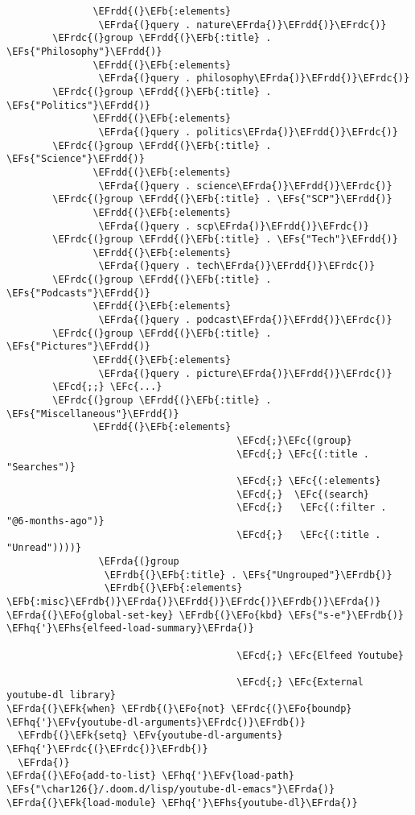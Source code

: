 \documentclass[a4wide,10pt]{article}
\newcommand{\EFc}[1]{\textcolor{EFc}{#1}} %
\newcommand{\EFcd}[1]{\textcolor{EFcd}{#1}} %
\newcommand{\EFs}[1]{\textcolor{EFs}{#1}} %
\newcommand{\EFk}[1]{\textcolor{EFk}{#1}} %
\newcommand{\EFb}[1]{\textcolor{EFb}{#1}} %
\newcommand{\EFv}[1]{\textcolor{EFv}{#1}} %
\newcommand{\EFo}[1]{\textcolor{EFo}{#1}} %
\newcommand{\EFhq}[1]{\textcolor{EFhq}{#1}} %
\newcommand{\EFhs}[1]{\textcolor{EFhs}{#1}} %
\newcommand{\EFrda}[1]{\textcolor{EFrda}{#1}} %
\newcommand{\EFrdb}[1]{\textcolor{EFrdb}{#1}} %
\newcommand{\EFrdc}[1]{\textcolor{EFrdc}{#1}} %
\newcommand{\EFrdd}[1]{\textcolor{EFrdd}{#1}} %
\begin{document}
\begin{Code}
\begin{Verbatim}
               \EFrdd{(}\EFb{:elements}
                \EFrda{(}query . nature\EFrda{)}\EFrdd{)}\EFrdc{)}
        \EFrdc{(}group \EFrdd{(}\EFb{:title} . \EFs{"Philosophy"}\EFrdd{)}
               \EFrdd{(}\EFb{:elements}
                \EFrda{(}query . philosophy\EFrda{)}\EFrdd{)}\EFrdc{)}
        \EFrdc{(}group \EFrdd{(}\EFb{:title} . \EFs{"Politics"}\EFrdd{)}
               \EFrdd{(}\EFb{:elements}
                \EFrda{(}query . politics\EFrda{)}\EFrdd{)}\EFrdc{)}
        \EFrdc{(}group \EFrdd{(}\EFb{:title} . \EFs{"Science"}\EFrdd{)}
               \EFrdd{(}\EFb{:elements}
                \EFrda{(}query . science\EFrda{)}\EFrdd{)}\EFrdc{)}
        \EFrdc{(}group \EFrdd{(}\EFb{:title} . \EFs{"SCP"}\EFrdd{)}
               \EFrdd{(}\EFb{:elements}
                \EFrda{(}query . scp\EFrda{)}\EFrdd{)}\EFrdc{)}
        \EFrdc{(}group \EFrdd{(}\EFb{:title} . \EFs{"Tech"}\EFrdd{)}
               \EFrdd{(}\EFb{:elements}
                \EFrda{(}query . tech\EFrda{)}\EFrdd{)}\EFrdc{)}
        \EFrdc{(}group \EFrdd{(}\EFb{:title} . \EFs{"Podcasts"}\EFrdd{)}
               \EFrdd{(}\EFb{:elements}
                \EFrda{(}query . podcast\EFrda{)}\EFrdd{)}\EFrdc{)}
        \EFrdc{(}group \EFrdd{(}\EFb{:title} . \EFs{"Pictures"}\EFrdd{)}
               \EFrdd{(}\EFb{:elements}
                \EFrda{(}query . picture\EFrda{)}\EFrdd{)}\EFrdc{)}
        \EFcd{;;} \EFc{...}
        \EFrdc{(}group \EFrdd{(}\EFb{:title} . \EFs{"Miscellaneous"}\EFrdd{)}
               \EFrdd{(}\EFb{:elements}
                                        \EFcd{;}\EFc{(group}
                                        \EFcd{;} \EFc{(:title . "Searches")}
                                        \EFcd{;} \EFc{(:elements}
                                        \EFcd{;}  \EFc{(search}
                                        \EFcd{;}   \EFc{(:filter . "@6-months-ago")}
                                        \EFcd{;}   \EFc{(:title . "Unread"))))}
                \EFrda{(}group
                 \EFrdb{(}\EFb{:title} . \EFs{"Ungrouped"}\EFrdb{)}
                 \EFrdb{(}\EFb{:elements} \EFb{:misc}\EFrdb{)}\EFrda{)}\EFrdd{)}\EFrdc{)}\EFrdb{)}\EFrda{)}
\EFrda{(}\EFo{global-set-key} \EFrdb{(}\EFo{kbd} \EFs{"s-e"}\EFrdb{)} \EFhq{'}\EFhs{elfeed-load-summary}\EFrda{)}

                                        \EFcd{;} \EFc{Elfeed Youtube}

                                        \EFcd{;} \EFc{External youtube-dl library}
\EFrda{(}\EFk{when} \EFrdb{(}\EFo{not} \EFrdc{(}\EFo{boundp} \EFhq{'}\EFv{youtube-dl-arguments}\EFrdc{)}\EFrdb{)}
  \EFrdb{(}\EFk{setq} \EFv{youtube-dl-arguments} \EFhq{'}\EFrdc{(}\EFrdc{)}\EFrdb{)}
  \EFrda{)}
\EFrda{(}\EFo{add-to-list} \EFhq{'}\EFv{load-path} \EFs{"\char126{}/.doom.d/lisp/youtube-dl-emacs"}\EFrda{)}
\EFrda{(}\EFk{load-module} \EFhq{'}\EFhs{youtube-dl}\EFrda{)}


\end{Verbatim}
\end{Code}
\end{document}
